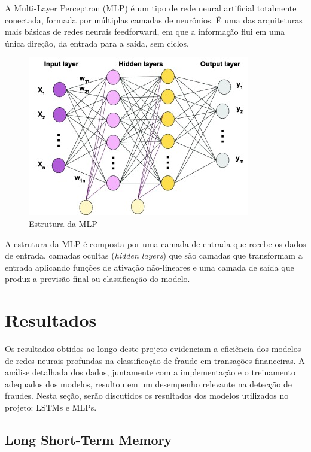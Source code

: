 \documentclass[conference]{IEEEtran}
\begin{document}
\indent A Multi-Layer Perceptron (MLP) é um tipo de rede neural artificial totalmente conectada, formada por múltiplas camadas de neurônios. É uma das arquiteturas mais básicas de redes neurais feedforward, em que a informação flui em uma única direção, da entrada para a saída, sem ciclos.

\begin{figure}[h!]
    \centering
    \includegraphics[width=\linewidth]{mlp.jpg}
    \caption{Estrutura da MLP}
    \label{fig:mlp}
\end{figure}


\indent A estrutura da MLP é composta por uma camada de entrada que recebe os dados de entrada, camadas ocultas (\textit{hidden layers}) que são camadas que transformam a entrada aplicando funções de ativação não-lineares e uma camada de saída que produz a previsão final ou classificação do modelo.

\section{Resultados}

Os resultados obtidos ao longo deste projeto evidenciam a eficiência dos modelos de redes neurais profundas na classificação de fraude em transações financeiras. A análise detalhada dos dados, juntamente com a implementação e o treinamento adequados dos modelos, resultou em um desempenho relevante na detecção de fraudes. Nesta seção, serão discutidos os resultados dos modelos utilizados no projeto: LSTMs e MLPs.

\subsection{Long Short-Term Memory}
\end{document}
